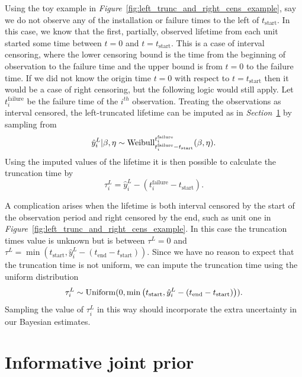 Using the toy example in \textit{Figure}~\ref{fig:left_trunc_and_right_cens_example}, say we do not observe any of the installation or failure times to the left of $t_\text{start}$. In this case, we know that the first, partially, observed lifetime from each unit started some time between $t = 0$ and $t = t_\text{start}$. This is a case of interval censoring, where the lower censoring bound is the time from the beginning of observation to the failure time and the upper bound is from $t = 0$ to the failure time. If we did not know the origin time $t = 0$ with respect to $t = t_\text{start}$ then it would be a case of right censoring, but the following logic would still apply. Let $t^{\text{failure}}_{i}$ be the failure time of the $i^{th}$ observation. Treating the observations as interval censored, the left-truncated lifetime can be imputed as in \textit{Section}~\ref{} by sampling from
\begin{equation}
    \hat{y}^L_i|\beta, \eta \sim \hbox{Weibull}^{t^{\text{failure}}_{i}}_{t^{\text{failure}}_{i} - t_\text{start}}(\beta, \eta).
\end{equation}
Using the imputed values of the lifetime it is then possible to calculate the truncation time by
\begin{equation}
    \tau^L_i = \hat{y}^L_i - \left(t^{\text{failure}}_{i} - t_\text{start}\right).
\end{equation}

A complication arises when the lifetime is both interval censored by the start of the observation period and right censored by the end, such as unit one in \textit{Figure}~\ref{fig:left_trunc_and_right_cens_example}. In this case the truncation times value is unknown but is between $\tau^L = 0$ and $\tau^L = \min\left(t_\text{start}, \hat{y}^L_i - (t_\text{end} - t_\text{start})\right)$. Since we have no reason to expect that the truncation time is not uniform, we can impute the truncation time using the uniform distribution
\begin{equation}
    \tau^L_i \sim \hbox{Uniform}(0, \min\left(t_\text{start}, \hat{y}^L_i - (t_\text{end} - t_\text{start})\right)).
\end{equation}
Sampling the value of $\tau^L_i$ in this way should incorporate the extra uncertainty in our Bayesian estimates.

\section{Informative joint prior}

